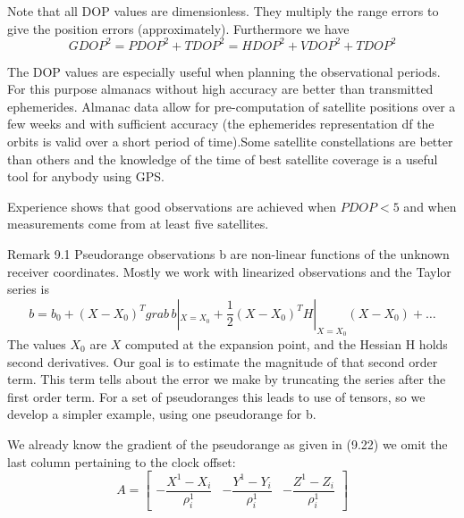 		Note that all DOP values are dimensionless. They multiply the range errors to give the position errors (approximately). Furthermore we have
		\[
			GDOP^2=PDOP^2+TDOP^2=HDOP^2+VDOP^2+TDOP^2
		\]
			
		The DOP values are especially useful when planning the observational periods. For this purpose almanacs without high accuracy are better than transmitted ephemerides. Almanac data allow for pre-computation of satellite positions over a few weeks and with sufficient accuracy (the ephemerides representation df the orbits is valid over a short period of time).Some satellite constellations are better than others and the knowledge of the time of best satellite coverage is a useful tool for anybody using GPS.
			
		Experience shows that good observations are achieved when $PDOP<5$ and when measurements come from at least five satellites.
			
		Remark 9.1 Pseudorange observations b are non-linear functions of the unknown receiver coordinates. Mostly we work with linearized observations and the Taylor series is
		\[
			b=b_0+(X-X_0)^Tgrab\,b|_{X=X_0}+\frac{1}{2}(X-X_0)^TH|_{X=X_0}(X-X_0)+\ldots
		\]	
		The values $X_0$ are $X$ computed at the expansion point, and the Hessian H holds second derivatives. Our goal is to estimate the magnitude of that second order term. This term tells about the error we make by truncating the series after the first order term. For a set of pseudoranges this leads to use of tensors, so we develop a simpler example, using one pseudorange for b.
			
		We already know the gradient of the pseudorange as given in (9.22) we omit the last column pertaining to the clock offset:
		\begin{equation}\label{eq:9.30}
			A=\begin{bmatrix}
			-\dfrac{X^1-X_i}{\rho^1_i} & -\dfrac{Y^1-Y_i}{\rho^1_i} & -\dfrac{Z^1-Z_i}{\rho^1_i}
			\end{bmatrix}
		\end{equation}
			
